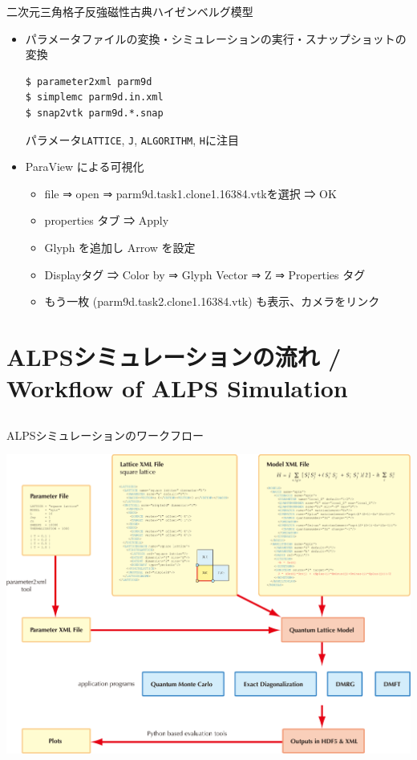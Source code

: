 \begin{frame}[t,fragile]{二次元三角格子反強磁性古典ハイゼンベルグ模型}
  \begin{itemize}
  \item パラメータファイルの変換・シミュレーションの実行・スナップショットの変換
\begin{lstlisting}
$ parameter2xml parm9d
$ simplemc parm9d.in.xml
$ snap2vtk parm9d.*.snap
\end{lstlisting}
パラメータ\verb+LATTICE+, \verb+J+, \verb+ALGORITHM+, \verb+H+に注目
  \item ParaView による可視化
    \begin{itemize}
      \item file ⇒ open ⇒ parm9d.task1.clone1.16384.vtkを選択 ⇒  OK
      \item properties タブ ⇒ Apply
      \item Glyph を追加し Arrow を設定
      \item Displayタグ ⇒ Color by ⇒ Glyph Vector ⇒ Z ⇒ Properties タグ
      \item もう一枚 (parm9d.task2.clone1.16384.vtk) も表示、カメラをリンク
    \end{itemize}
  \end{itemize}
\end{frame}

\section{ALPSシミュレーションの流れ / Workflow of ALPS Simulation}
\subsection*{\redb\whiteb\greenb}

\begin{frame}{ALPSシミュレーションのワークフロー}
  \begin{center}
    \includegraphics[height=0.8\textheight]{workflow.pdf}
  \end{center}
\end{frame}

